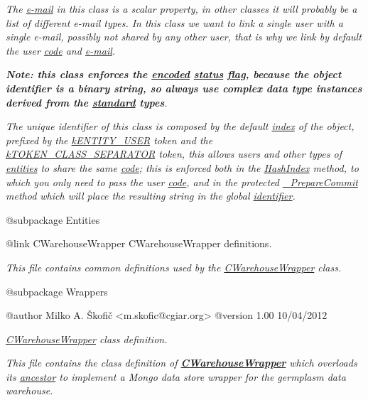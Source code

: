 {\itshape The \hyperlink{}{e-\/mail} in this class is a scalar property, in other classes it will probably be a list of different e-\/mail types. In this class we want to link a single user with a single e-\/mail, possibly not shared by any other user, that is why we link by default the user \hyperlink{}{code} and \hyperlink{}{e-\/mail}.}

{\itshape {\itshape {\bfseries Note\-: this class enforces the \hyperlink{}{encoded} \hyperlink{}{status} \hyperlink{}{flag}, because the object identifier is a binary string, so always use complex data type instances derived from the \hyperlink{class_c_data_type}{standard} types}}.}

{\itshape The unique identifier of this class is composed by the default \hyperlink{}{index} of the object, prefixed by the \hyperlink{}{k\-E\-N\-T\-I\-T\-Y\-\_\-\-U\-S\-E\-R} token and the \hyperlink{}{k\-T\-O\-K\-E\-N\-\_\-\-C\-L\-A\-S\-S\-\_\-\-S\-E\-P\-A\-R\-A\-T\-O\-R} token, this allows users and other types of \hyperlink{class_c_entity}{entities} to share the same \hyperlink{}{code}; this is enforced both in the \hyperlink{}{Hash\-Index} method, to which you only need to pass the user \hyperlink{}{code}, and in the protected \hyperlink{}{\-\_\-\-Prepare\-Commit} method which will place the resulting string in the global \hyperlink{}{identifier}.}

{\itshape \begin{DoxyVerb} @subpackage        Entities\end{DoxyVerb}
}

{\itshape \begin{DoxyVerb} {@link CWarehouseWrapper CWarehouseWrapper} definitions.
\end{DoxyVerb}
}

{\itshape This file contains common definitions used by the \hyperlink{class_c_warehouse_wrapper}{C\-Warehouse\-Wrapper} class.}

{\itshape \begin{DoxyVerb} @subpackage        Wrappers

 @author            Milko A. Škofič <m.skofic@cgiar.org>
 @version   1.00 10/04/2012\end{DoxyVerb}
}

{\itshape {\itshape \hyperlink{class_c_warehouse_wrapper}{C\-Warehouse\-Wrapper}} class definition.}

{\itshape This file contains the class definition of {\bfseries \hyperlink{class_c_warehouse_wrapper}{C\-Warehouse\-Wrapper}} which overloads its \hyperlink{class_c_mongo_data_wrapper}{ancestor} to implement a Mongo data store wrapper for the germplasm data warehouse.}

